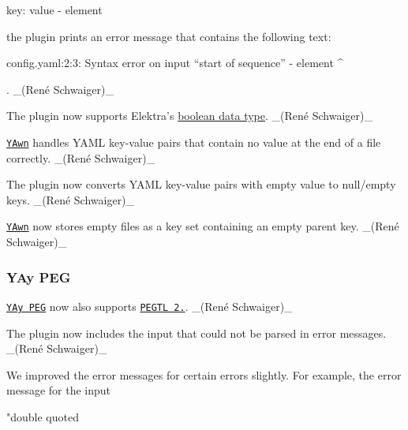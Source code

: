 \begin{DoxyCode}
key: value
  - element
\end{DoxyCode}


the plugin prints an error message that contains the following text\+:


\begin{DoxyCode}
config.yaml:2:3: Syntax error on input “start of sequence”
                   - element
                   ^
\end{DoxyCode}


. \+\_\+(René Schwaiger)\+\_\+


\begin{DoxyItemize}
\item The plugin now supports Elektra’s \hyperlink{doc_decisions_bool_md}{boolean data type}. \+\_\+(René Schwaiger)\+\_\+
\item \href{https://www.libelektra.org/plugins/yawn}{\tt Y\+Awn} handles Y\+A\+ML key-\/value pairs that contain no value at the end of a file correctly. \+\_\+(René Schwaiger)\+\_\+
\item The plugin now converts Y\+A\+ML key-\/value pairs with empty value to null/empty keys. \+\_\+(René Schwaiger)\+\_\+
\item \href{https://www.libelektra.org/plugins/yawn}{\tt Y\+Awn} now stores empty files as a key set containing an empty parent key. \+\_\+(René Schwaiger)\+\_\+
\end{DoxyItemize}

\subsubsection*{Y\+Ay P\+EG}


\begin{DoxyItemize}
\item \href{https://www.libelektra.org/plugins/yaypeg}{\tt Y\+Ay P\+EG} now also supports \href{https://github.com/taocpp/PEGTL/releases/tag/2.8.0}{\tt P\+E\+G\+TL 2.}. \+\_\+(René Schwaiger)\+\_\+
\item The plugin now includes the input that could not be parsed in error messages. \+\_\+(René Schwaiger)\+\_\+
\item We improved the error messages for certain errors slightly. For example, the error message for the input
\end{DoxyItemize}


\begin{DoxyCode}
"double quoted
\end{DoxyCode}


